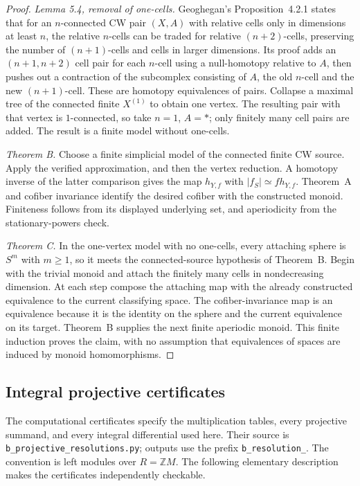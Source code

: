 \begin{proof}
\emph{Lemma 5.4, removal of one-cells.}  Geoghegan's Proposition~4.2.1
\cite{Geoghegan2008B}
states that for an $n$-connected CW pair $(X,A)$ with relative cells
only in dimensions at least $n$, the relative $n$-cells can be traded
for relative $(n+2)$-cells, preserving the number of $(n+1)$-cells
and cells in larger dimensions.  Its proof adds an $(n+1,n+2)$ cell
pair for each $n$-cell using a null-homotopy relative to $A$, then
pushes out a contraction of the subcomplex consisting of $A$, the old
$n$-cell and the new $(n+1)$-cell.  These are homotopy equivalences of
pairs.  Collapse a maximal tree of the connected finite $X^{(1)}$ to
obtain one vertex.  The resulting pair with that vertex is
$1$-connected, so take $n=1$, $A=*$; only finitely many cell pairs
are added.  The result is a finite model without one-cells.

\emph{Theorem B.}  Choose a finite simplicial model of the connected
finite CW source.  Apply the verified approximation, and then the
vertex reduction.  A homotopy inverse of the latter comparison gives
the map $h_{Y,f}$ with $|f_S|\simeq f h_{Y,f}$.  Theorem~A and
cofiber invariance identify the desired cofiber with the constructed
monoid.  Finiteness follows from its displayed underlying set, and
aperiodicity from the stationary-powers check.

\emph{Theorem C.}  In the one-vertex model with no one-cells, every
attaching sphere is $S^m$ with $m\ge1$, so it meets the connected-source
hypothesis of Theorem~B.  Begin with the trivial monoid and attach the
finitely many cells in nondecreasing dimension.  At each step compose
the attaching map with the already constructed equivalence to the
current classifying space.  The cofiber-invariance map is an
equivalence because it is the identity on the sphere and the current
equivalence on its target.  Theorem~B supplies the next finite aperiodic
monoid.  This finite induction proves the claim, with no assumption
that equivalences of spaces are induced by monoid homomorphisms.
\end{proof}

\subsection{Integral projective certificates}
The computational certificates specify the multiplication tables, every
projective summand, and every integral differential used here.  Their
source is \texttt{b\_projective\_resolutions.py}; outputs use the prefix
\texttt{b\_resolution\_}. The convention is left modules over $R=\mathbb ZM$.
The following elementary
description makes the certificates independently checkable.

